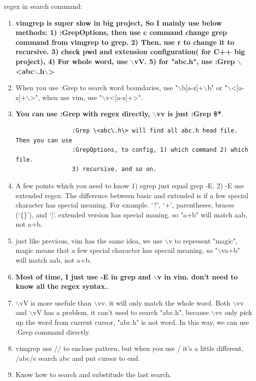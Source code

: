 \documentclass[paper=8.5in:11in, twoside, 12pt, pagesize=pdftex]{book}
\begin{document}
 regex in search command:
		\begin{enumerate}
			
			\item \textbf{vimgrep is super slow in big project, So I mainly use below methods: 1) :GrepOptions, then use c command change grep command from vimgrep to grep. 2) Then, use r to change it to recursive. 3) check pwd and extension configuration( for C++ big project), 4) For whole word, use $\backslash$vV. 5) for "abc.h", use :Grep $\backslash$<abc$\backslash$.h$\backslash$> }
			
			\item When you use :Grep to search word boundaries, use "$\backslash$b[a-z]+$\backslash$b" or "$\backslash$<[a-z]+$\backslash$>", when use vim, use "$\backslash$v<[a-z]+>". 
			\item \textbf{You can use :Grep with regex directly, $\backslash$vv is just :Grep \$*}. 
			\begin{verbatim}
				:Grep \<abc\.h\> will find all abc.h head file. Then you can use
				:GrepOptions, to config, 1) which command 2) which file. 
				3) recursive. and so on. 
			\end{verbatim}	
			
			\item A few points which you need to know 1) egrep just equal grep -E. 2) -E use extended regex. The difference between basic and extended is if a few special character has special meaning. For example. ‘?’, ‘+’, parentheses, braces (‘\{\}’), and ‘|’. extended version has special maning. so "a+b" will match aab, not a+b.  
			
			\item just like previous, vim has the same idea, we use $\backslash$v to represent "magic", magic means that a few special character has specail meaning.  so "$\backslash$va+b" will match aab, not a+b. 
			
			\item \textbf{Most of time, I just use -E in grep and $\backslash$v in vim. don't need to know all the regex syntax.}.
			
			\item $\backslash$vV is more usefule than $\backslash$vv. it will only match the whole word.  Both $\backslash$vv and $\backslash$vV has a problem, it can't used to search "abc.h", because $\backslash$vv only pick up the word from current cursor, "abc.h" is not word. In this way, we can use :Grep command directly.
			
			\item vimgrep use // to enclose pattern, but when you use / it's a little different, /abc/e search abc and put cursor to end.
			\item Know how to search and substitude the last search. 
			

\end{enumerate}
\end{document}
